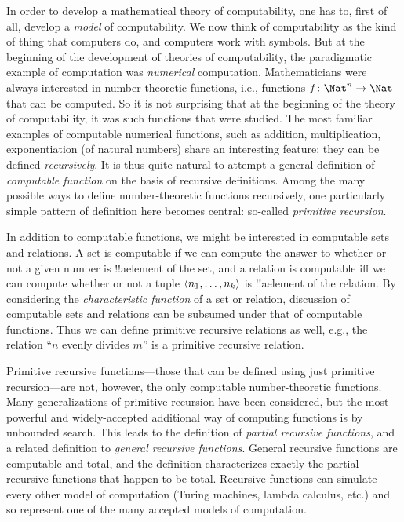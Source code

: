 \documentclass[../../../include/open-logic-section]{subfiles}
\begin{document}

In order to develop a mathematical theory of computability, one has to,
first of all, develop a \emph{model} of computability.  We now think of
computability as the kind of thing that computers do, and computers
work with symbols.  But at the beginning of the development of
theories of computability, the paradigmatic example of computation was
\emph{numerical} computation.  Mathematicians were always interested
in number-theoretic functions, i.e., functions $f\colon \Nat^n \to
\Nat$ that can be computed. So it is not surprising that at the
beginning of the theory of computability, it was such functions that
were studied.  The most familiar examples of computable numerical
functions, such as addition, multiplication, exponentiation (of
natural numbers) share an interesting feature: they can be defined
\emph{recursively}.  It is thus quite natural to attempt a general
definition of \emph{computable function} on the basis of recursive
definitions.  Among the many possible ways to define number-theoretic
functions recursively, one particularly simple pattern of definition
here becomes central: so-called \emph{primitive recursion}.

In addition to computable functions, we might be interested in
computable sets and relations. A set is computable if we can compute
the answer to whether or not a given number is !!a{element} of the
set, and a relation is computable iff we can compute whether or not a
tuple $\langle n_1, \dots, n_k \rangle$ is !!a{element} of the relation.  By
considering the \emph{characteristic function} of a set or relation,
discussion of computable sets and relations can be subsumed under that
of computable functions.  Thus we can define primitive recursive
relations as well, e.g., the relation ``$n$ evenly divides $m$'' is a
primitive recursive relation.

Primitive recursive functions---those that can be defined using just
primitive recursion---are not, however, the only computable
number-theoretic functions. Many generalizations of primitive
recursion have been considered, but the most powerful and
widely-accepted additional way of computing functions is by unbounded
search.  This leads to the definition of \emph{partial recursive
  functions}, and a related definition to \emph{general recursive
  functions}.  General recursive functions are computable and total,
and the definition characterizes exactly the partial recursive
functions that happen to be total.  Recursive functions can simulate
every other model of computation (Turing machines, lambda calculus,
etc.) and so represent one of the many accepted models of computation.
\end{document}

